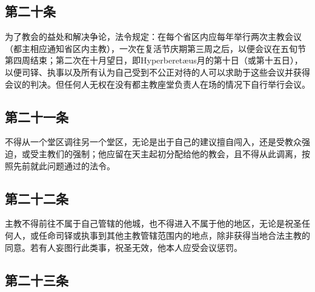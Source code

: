 
\subsection{第二十条}

为了教会的益处和解决争论，法令规定：在每个省区内应每年举行两次主教会议（都主相应通知省区内主教），一次在复活节庆期第三周之后，以便会议在五旬节第四周结束；第二次在十月望日，即Hyperberetæus月的第十日（或第十五日），以便司铎、执事以及所有认为自己受到不公正对待的人可以求助于这些会议并获得会议的判决。但任何人无权在没有都主教座堂负责人在场的情况下自行举行会议。\par

\par


\subsection{第二十一条}

不得从一个堂区调往另一个堂区，无论是出于自己的建议擅自闯入，还是受教众强迫，或受主教们的强制；他应留在天主起初分配给他的教会，且不得从此调离，按照先前就此问题通过的法令。\par


\subsection{第二十二条}

主教不得前往不属于自己管辖的他城，也不得进入不属于他的地区，无论是祝圣任何人，或任命司铎或执事到其他主教管辖范围内的地点，除非获得当地合法主教的同意。若有人妄图行此类事，祝圣无效，他本人应受会议惩罚。\par


\subsection{第二十三条}

